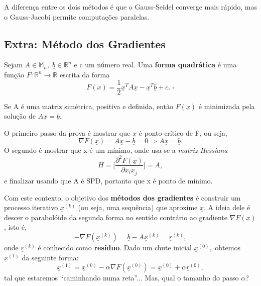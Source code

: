 \documentclass[../numerical_methods.tex]{subfiles}
\begin{document}
A diferença entre os dois métodos é que o Gauss-Seidel converge mais rápido, mas o Gauss-Jacobi permite computações paralelas.

\subsection{Extra: Método dos Gradientes}
\begin{def*}
	Sejam \(A\in \mathbb{M}_{n},\; \underline{b}\in \mathbb{R}^{n}\) e c um número real. Uma \textbf{forma quadrática} é uma função \(F:\mathbb{R}^{n}\rightarrow \mathbb{R}\) escrita da forma
	\[
		F(x) = \frac{1}{2}\underline{x}^{T}A \underline{x} - \underline{x}^{T}\underline{b} + c. \; \square
	\]
\end{def*}

\begin{prop*}
	Se A é uma matriz simétrica, positiva e definida, então \(F(\underline{x})\) é minimizada pela solução de \(A \underline{x} = \underline{b}\).
\end{prop*}
\begin{proof*}[Esboço]
	O primeiro passo da prova é mostrar que \(\underline{x}\) é ponto crítico de F, ou seja,
	\[
		\nabla F(\underline{x}) = A \underline{x}-\underline{b} = 0 \Rightarrow A \underline{x} = \underline{b}.
	\]
	O segundo é mostrar que x é um mínimo, onde usa-se a \textit{matriz Hessiana}
	\[
		H = \biggl[\frac{\partial^{2}F(\underline{x})}{\partial x_{i}x_{j}^{}}\biggr] = A,
	\]
	e finalizar usando que A é SPD, portanto que x é ponto de mínimo. \qedsymbol
\end{proof*}

Com este contexto, o objetivo dos \textbf{métodos dos gradientes} é construir um processo iterativo \(\underline{x}^{(k)}\) (ou seja, uma sequência) que aproxime \(\underline{x}\). A ideia dele é descer o parabolóide da segunda forma no sentido contrário ao gradiente \(\nabla F(\underline{x})\), isto é,
\[
	- \nabla F(\underline{x}^{(k)}) = \underline{b} - A \underline{x}^{(k)} = \underline{r}^{(k)},
\]
onde \(\underline{r}^{(k)}\) é conhecido como \textbf{resíduo}. Dado um chute inicial \(\underline{x}^{(0)},\) obtemos \(\underline{x}^{(1)}\) da seguinte forma:
\[
	\underline{x}^{(1)}=\underline{x}^{(0)}-\alpha \nabla F(\underline{x}^{(0)}) = \underline{x}^{(0)} + \alpha \underline{r}^{(0)},
\]
tal que estaremos ``caminhando numa reta''... Mas, qual o tamanho do passo \(\alpha \)?
\end{document}
